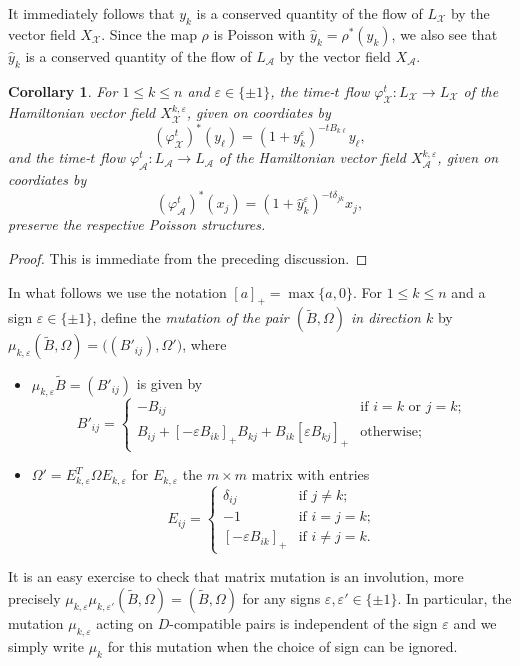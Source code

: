 \documentclass{amsart}
\newtheorem{corollary}[theorem]{Corollary}
\numberwithin{equation}{section}
\newcommand{\cA}{\mathcal{A}}
\newcommand{\cX}{\mathcal{X}}
\renewcommand{\max}{\operatorname{max}}
\begin{document}
It immediately follows that $y_k$ is a conserved quantity of the flow of $L_\cX$ by the vector field $X_\cX$.
Since the map $\rho$ is Poisson with $\hat y_k=\rho^*(y_k)$, we also see that $\hat y_k$ is a conserved quantity of the flow of $L_\cA$ by the vector field $X_\cA$.
\begin{corollary}
  \label{cor:time-one flows}
  For $1\le k\le n$ and $\varepsilon\in\{\pm1\}$, the time-$t$ flow $\varphi_\cX^t:L_\cX\to L_\cX$ of the Hamiltonian vector field $X_\cX^{k,\varepsilon}$, given on coordiates by
  \[(\varphi_\cX^t)^*(y_\ell)=(1+y_k^\varepsilon)^{-tB_{k\ell}}y_\ell,\]
  and the time-$t$ flow $\varphi_\cA^t:L_\cA\to L_\cA$ of the Hamiltonian vector field $X_\cA^{k,\varepsilon}$, given on coordiates by
  \[(\varphi_\cA^t)^*(x_j)=(1+\hat y_k^\varepsilon)^{-t\delta_{jk}}x_j,\]
  preserve the respective Poisson structures.
\end{corollary}
\begin{proof}
  This is immediate from the preceding discussion.
\end{proof}

In what follows we use the notation $[a]_+=\max\{a,0\}$.
For $1\le k\le n$ and a sign $\varepsilon\in\{\pm1\}$, define the \emph{mutation of the pair $(\tilde B,\Omega)$ in direction $k$} by $\mu_{k,\varepsilon}(\tilde B,\Omega)=\big((B'_{ij}),\Omega'\big)$, where
\begin{itemize}
  \item $\mu_{k,\varepsilon}\tilde B=(B'_{ij})$ is given by
    \[B'_{ij}=\begin{cases}-B_{ij} & \text{if $i=k$ or $j=k$;}\\ B_{ij}+[-\varepsilon B_{ik}]_+B_{kj}+B_{ik}[\varepsilon B_{kj}]_+ & \text{otherwise;}\end{cases}\]
  \item $\Omega'=E_{k,\varepsilon}^T\Omega E_{k,\varepsilon}$ for $E_{k,\varepsilon}$ the $m\times m$ matrix with entries
    \[E_{ij}=\begin{cases}\delta_{ij} & \text{if $j\ne k$;}\\ -1 & \text{if $i=j=k$;}\\ [-\varepsilon B_{ik}]_+ & \text{if $i\ne j=k$.}\end{cases}\]
\end{itemize}
It is an easy exercise to check that matrix mutation is an involution, more precisely $\mu_{k,\varepsilon}\mu_{k,\varepsilon'}(\tilde B,\Omega)=(\tilde B,\Omega)$ for any signs $\varepsilon,\varepsilon'\in\{\pm1\}$.
In particular, the mutation $\mu_{k,\varepsilon}$ acting on $D$-compatible pairs is independent of the sign $\varepsilon$ and we simply write $\mu_k$ for this mutation when the choice of sign can be ignored.
\end{document}
